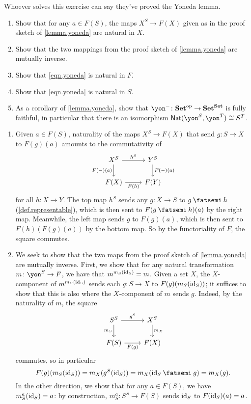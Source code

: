 \documentclass[Book-Poly]{subfiles}
\begin{document}
\begin{exercise}\label{exc.finish_proof_yoneda}
Whoever solves this exercise can say they've proved the Yoneda lemma.
\begin{enumerate}
	\item Show that for any $a\in F(S)$, the maps $X^S\to F(X)$ given as in the proof sketch of \cref{lemma.yoneda} are natural in $X$.
	\item Show that the two mappings from the proof sketch of \cref{lemma.yoneda} are mutually inverse.
	\item Show that \eqref{eqn.yoneda} is natural in $F$.
	\item Show that \eqref{eqn.yoneda} is natural in $S$.
	\item As a corollary of \cref{lemma.yoneda}, show that $\yon^-\colon\smset\op\to\smset^\smset$ is fully faithful, in particular that there is an isomorphism $\nat(\yon^S,\yon^T)\cong S^T$.
\qedhere
\end{enumerate}

\begin{solution}
\begin{enumerate}
    \item Given $a \in F(S)$, naturality of the maps $X^S \to F(X)$ that send $g \colon S \to X$ to $F(g)(a)$ amounts to the commutativity of
    \[
    \begin{tikzcd}[ampersand replacement=\&]
    	X^S\ar[r, "h^S"]\ar[d, "F(-)(a)"']\&
    	Y^S\ar[d, "F(-)(a)"]\\
    	F(X)\ar[r, "F(h)"']\&
    	F(Y)
    \end{tikzcd}
    \]
    for all $h \colon X \to Y$.
    The top map $h^S$ sends any $g \colon X \to S$ to $g \then h$ (\cref{def.representable}), which is then sent to $F(g \then h)(a)$ by the right map.
    Meanwhile, the left map sends $g$ to $F(g)(a)$, which is then sent to $F(h)(F(g)(a))$ by the bottom map.
    So by the functoriality of $F$, the square commutes.
    
    \item We seek to show that the two maps from the proof sketch of \cref{lemma.yoneda} are mutually inverse. First, we show that for any natural transformation $m \colon \yon^S \to F$, we have that $m^{m_S(\mathrm{id}_S)} = m$.
    Given a set $X$, the $X$-component of $m^{m_S(\mathrm{id}_S)}$ sends each $g \colon S \to X$ to $F(g)(m_S(\mathrm{id}_S))$; it suffices to show that this is also where the $X$-component of $m$ sends $g$.
    Indeed, by the naturality of $m$, the square
    \[
    \begin{tikzcd}[ampersand replacement=\&]
    	S^S\ar[r, "g^S"]\ar[d, "m_S"']\&
    	X^S\ar[d, "m_X"]\\
    	F(S)\ar[r, "F(g)"']\&
    	F(X)
    \end{tikzcd}
    \]
    commutes, so in particular
    \begin{equation} \label{eqn.finish_proof_yoneda}
        F(g)(m_S(\id_S)) = m_X(g^S(\id_S)) = m_X(\id_S \then g) = m_X(g).
    \end{equation}
    In the other direction, we show that for any $a \in F(S)$, we have $m^a_S(\mathrm{id}_S) = a$: by construction, $m^a_S \colon S^S \to F(S)$ sends $\mathrm{id}_S$ to $F(\mathrm{id}_S)(a) = a$.
    

\end{enumerate}
\end{solution}
\end{exercise}
\end{document}
